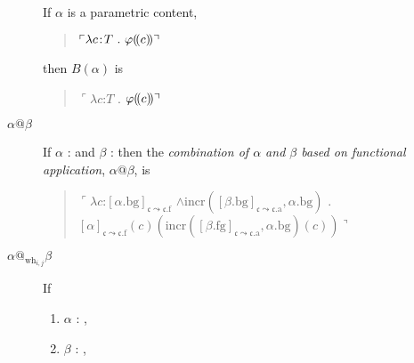 \begin{description}
  If $\alpha$ is a parametric content,
  \begin{quote}
    $\ulcorner\lambda c\!:\!T\ .\ \varphi\dep{c}\urcorner$
  \end{quote}
  then $B(\alpha)$ is
  \begin{quote}
    $\ulcorner\lambda c$:$T$\fbox{\d{$\wedge$}}
    . $\varphi(\!(c)\!)\urcorner$
  \end{quote}
  

\item[\textnormal{$\alpha\text{@}\beta$}] \mbox{}

  If $\alpha$ :  
and $\beta$ : 
                         then the \textit{combination of $\alpha$ and
    $\beta$  based on functional application}, $\alpha\text{@}\beta$, is
  \begin{quote}
   $\ulcorner\lambda c$:$[\alpha.\text{bg}]_{\mathfrak{c}\leadsto\mathfrak{c}.\text{f}}$
      \d{$\wedge$}$\mathrm{incr}([\beta.\text{bg}]_{\mathfrak{c}\leadsto\mathfrak{c}.\text{a}},\alpha.\text{bg})$
      . \\
      \hspace*{2em}$[\alpha]_{\mathfrak{c}\leadsto\mathfrak{c}.\text{f}}(c)(\mathrm{incr}([\beta.\text{fg}]_{\mathfrak{c}\leadsto\mathfrak{c}.\text{a}},\alpha.\text{bg})(c))\urcorner$

      
    \end{quote}

      \item[\textnormal{$\alpha\text{@}_{\mathrm{wh}_{i,j}}\beta$}]
    \mbox{}

      If
  \begin{enumerate}
  \item $\alpha$ : ,
    
  \item $\beta$ : ,
    

\end{enumerate}
\end{description}

